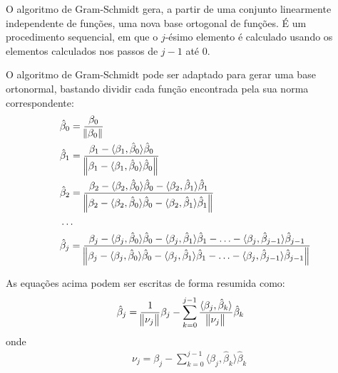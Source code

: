 O algoritmo de Gram-Schmidt gera, a partir de uma conjunto linearmente independente de funções, uma nova base ortogonal de funções. É um procedimento sequencial, em que o $j$-ésimo elemento é calculado usando os elementos calculados nos passos de $j-1$ até $0$.

O algoritmo de Gram-Schmidt pode ser adaptado para gerar uma base ortonormal, bastando dividir cada função encontrada pela sua norma correspondente:
\begin{align}
& \hat{\beta}_0 = \frac{\beta_0}{\norm{\beta_0}} \label{gram_schmidt_01} \\
& \hat{\beta}_1
=
\frac{\beta_1 - \langle \beta_1, \hat{\beta}_0\rangle\hat{\beta}_0}
{\norm{\beta_1 - \langle \beta_1, \hat{\beta}_0\rangle\hat{\beta}_0}}\label{gram_schmidt_02} \\
& \hat{\beta}_2
=
\frac{\beta_2 - \langle \beta_2, \hat{\beta}_0\rangle\hat{\beta}_0 - \langle \beta_2, \hat{\beta}_1\rangle\hat{\beta}_1}
{\norm{\beta_2 - \langle \beta_2, \hat{\beta}_0\rangle\hat{\beta}_0 - \langle \beta_2, \hat{\beta}_1\rangle\hat{\beta}_1}} \label{gram_schmidt_03} \\
& \ldots \nonumber \\
& \hat{\beta}_j
=
\frac{\beta_j - \langle \beta_j, \hat{\beta}_0\rangle\hat{\beta}_0 - \langle \beta_j, \hat{\beta}_1\rangle\hat{\beta}_1 - \ldots - \langle \beta_j, \hat{\beta}_{j - 1}\rangle\hat{\beta}_{j - 1} }
{\norm{\beta_j - \langle \beta_j, \hat{\beta}_0\rangle\hat{\beta}_0 - \langle \beta_j, \hat{\beta}_1\rangle\hat{\beta}_1 - \ldots - \langle \beta_j, \hat{\beta}_{j - 1}\rangle\hat{\beta}_{j - 1} }} \label{gram_schmidt_04}
\end{align}

As equações acima podem ser escritas de forma resumida como:
\begin{align}
& \hat{\beta}_j = \frac{1}{\norm{\nu_j}}\beta_j - \sum_{k=0}^{j-1} \frac{\langle \beta_j, \hat{\beta}_k \rangle}{\norm{\nu_j}} \hat{\beta}_k \label{termo_beta}
\end{align}
onde
\begin{align}
& \nu_j = \beta_j - \sum_{k = 0}^{j - 1} \langle \beta_j, \hat{\beta}_k\rangle\hat{\beta}_k
\end{align}

